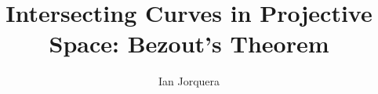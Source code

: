 \documentclass{article}
\title{Intersecting Curves in Projective Space: Bezout's Theorem}
\author{Ian Jorquera}
\begin{document}
\maketitle





\nocite{*}


\end{document}
